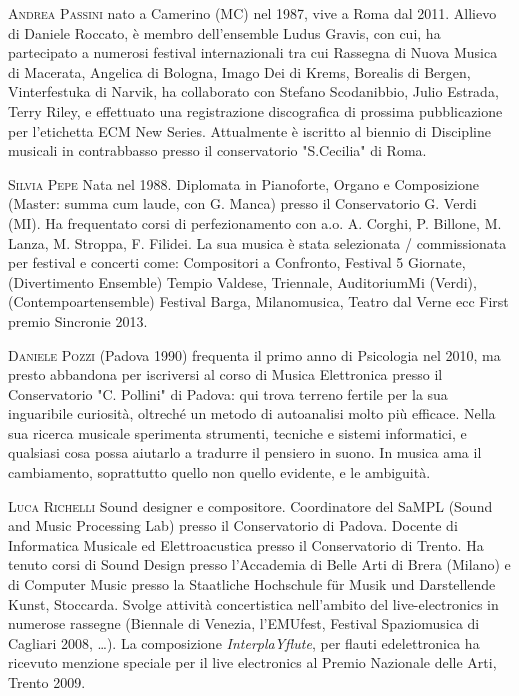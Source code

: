 \documentclass[9pt, twoside, a5paper]{extreport}
\newcommand{\biografia}[2]{%
\noindent \textsc{#1} %
#2 %
\medskip
}%
\begin{document}
\begin{multicols}{2}
\biografia{Andrea Passini}{nato a Camerino (MC) nel 1987, vive a Roma dal 2011. Allievo di Daniele Roccato, è membro dell’ensemble Ludus Gravis, con cui, ha partecipato a numerosi festival internazionali tra cui Rassegna di Nuova Musica di Macerata, Angelica di Bologna, Imago Dei di Krems, Borealis di Bergen, Vinterfestuka di Narvik, ha collaborato con Stefano Scodanibbio, Julio Estrada, Terry Riley, e effettuato una registrazione discografica di prossima pubblicazione per l’etichetta ECM New Series. Attualmente è iscritto al biennio di Discipline musicali in contrabbasso presso il conservatorio "S.Cecilia" di Roma.}

\biografia{Silvia Pepe}{Nata nel 1988. Diplomata in Pianoforte, Organo e Composizione (Master: summa cum laude, con G. Manca) presso il Conservatorio G. Verdi (MI). Ha frequentato corsi di perfezionamento con a.o. A. Corghi, P. Billone, M. Lanza, M. Stroppa, F. Filidei. La sua musica è stata selezionata / commissionata per festival e concerti come: Compositori a Confronto, Festival 5 Giornate, (Divertimento Ensemble) Tempio Valdese, Triennale, AuditoriumMi (Verdi), (Contempoartensemble) Festival Barga, Milanomusica, Teatro dal Verne ecc First premio Sincronie 2013.}




\biografia{Daniele Pozzi}{(Padova 1990) frequenta il primo anno di Psicologia nel 2010, ma presto abbandona per iscriversi al corso di Musica Elettronica presso il Conservatorio "C. Pollini" di Padova: qui trova terreno fertile per la sua inguaribile curiosità, oltreché un metodo di autoanalisi molto più efficace. Nella sua ricerca musicale sperimenta strumenti, tecniche e sistemi informatici, e qualsiasi cosa possa aiutarlo a tradurre il pensiero in suono. In musica ama il cambiamento, soprattutto quello non quello evidente, e le ambiguità.}


\biografia{Luca Richelli}{Sound designer e compositore. Coordinatore del SaMPL (Sound and Music Processing Lab) presso il Conservatorio di Padova. Docente di Informatica Musicale ed Elettroacustica presso il Conservatorio di Trento. Ha tenuto corsi di Sound Design presso l'Accademia di Belle Arti di Brera (Milano) e di Computer Music presso la Staatliche Hochschule für Musik und Darstellende Kunst, Stoccarda. Svolge attività concertistica nell'ambito del live-electronics in numerose rassegne (Biennale di Venezia, l'EMUfest, Festival Spaziomusica di Cagliari 2008, {\dots}). La composizione \textit{InterplaYflute}, per flauti edelettronica ha ricevuto menzione speciale per il live electronics al Premio Nazionale delle Arti, Trento 2009.}


\end{multicols}
\end{document}
